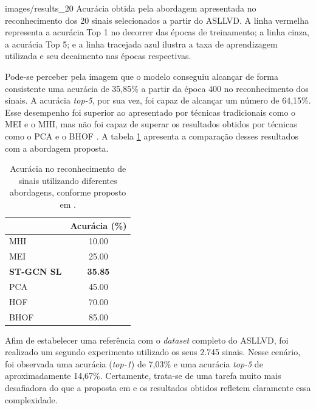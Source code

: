     {images/results_20}
    {Acurácia obtida pela abordagem apresentada no reconhecimento dos 20 sinais selecionados a partir do ASLLVD. A linha vermelha representa a acurácia Top 1 no decorrer das épocas de treinamento; a linha cinza, a acurácia Top 5; e a linha tracejada azul ilustra a taxa de aprendizagem utilizada e seu decaimento nas épocas respectivas.}

Pode-se perceber pela imagem que o modelo conseguiu alcançar de forma consistente uma acurácia de 35,85\% a partir da época 400 no reconhecimento dos sinais. A acurácia \textit{top-5}, por sua vez, foi capaz de alcançar um número de 64,15\%. Esse desempenho foi superior ao apresentado por técnicas tradicionais como o MEI e o MHI, mas não foi capaz de superar os resultados obtidos por técnicas como o PCA e o BHOF \cite{lim-2016}. A tabela \ref{tab:results-comparison-20} apresenta a comparação desses resultados com a abordagem proposta.

\begin{table}[ht]
\centering
\caption{Acurácia no reconhecimento de sinais utilizando diferentes abordagens, conforme proposto em \cite{lim-2016}.}
\label{tab:results-comparison-20}
\begin{tabular}{lc}
\hline
                   & Acurácia (\%)  \\ \hline
MHI                & 10.00                     \\
MEI                & 25.00                     \\
\textbf{ST-GCN SL} & \textbf{35.85}            \\
PCA                & 45.00                     \\
HOF                & 70.00                     \\
BHOF               & 85.00                     \\ \hline
\end{tabular}
\end{table}



Afim de estabelecer uma referência com o \textit{dataset} completo do ASLLVD, foi realizado um segundo experimento utilizado os seus 2.745 sinais. Nesse cenário, foi observada uma acurácia (\textit{top-1}) de 7,03\% e uma acurácia \textit{top-5} de aproximadamente 14,67\%. Certamente, trata-se de uma tarefa muito mais desafiadora do que a proposta em \cite{lim-2016} e os resultados obtidos refletem claramente essa complexidade. 

